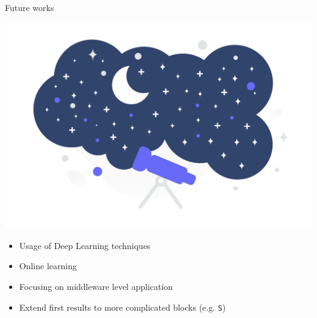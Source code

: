 \begin{frame}{\playfairblack Future works}
  \begin{backgroundblock} 
    \includegraphics[width=\paperwidth]{img/conclusion.pdf} 
  \end{backgroundblock} 
  \begin{card}
    \begin{itemize}  
      \item Usage of Deep Learning techniques
      \item Online learning
      \item Focusing on middleware level application
      \item Extend first results to more complicated blocks (e.g. \texttt{S})
    \end{itemize}
  \end{card}
\end{frame}